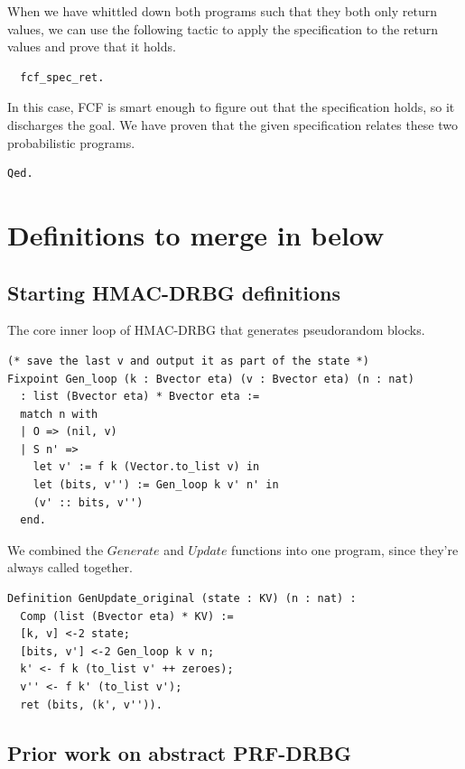 \documentclass[12pt,lot, lof]{puthesis}
\begin{document}
{When we have whittled down both programs such that they both only return values, we can use the following tactic to apply the specification to the return values and prove that it holds. 

\begin{lstlisting}
  fcf_spec_ret.
\end{lstlisting}

In this case, FCF is smart enough to figure out that the specification holds, so it discharges the goal. We have proven that the given specification relates these two probabilistic programs. 

\begin{lstlisting}
Qed.
\end{lstlisting}

\chapter{Definitions to merge in below}

\section{Starting HMAC-DRBG definitions}

The core inner loop of HMAC-DRBG that generates pseudorandom blocks. 

\begin{lstlisting}
(* save the last v and output it as part of the state *)
Fixpoint Gen_loop (k : Bvector eta) (v : Bvector eta) (n : nat)
  : list (Bvector eta) * Bvector eta :=
  match n with
  | O => (nil, v)
  | S n' =>
    let v' := f k (Vector.to_list v) in
    let (bits, v'') := Gen_loop k v' n' in
    (v' :: bits, v'')           
  end.
\end{lstlisting}

We combined the $Generate$ and $Update$ functions into one program, since they're always called together.

\begin{lstlisting}
Definition GenUpdate_original (state : KV) (n : nat) :
  Comp (list (Bvector eta) * KV) :=
  [k, v] <-2 state;
  [bits, v'] <-2 Gen_loop k v n;
  k' <- f k (to_list v' ++ zeroes);
  v'' <- f k' (to_list v');
  ret (bits, (k', v'')).
\end{lstlisting}

\section{Prior work on abstract PRF-DRBG}

}
\end{document}
